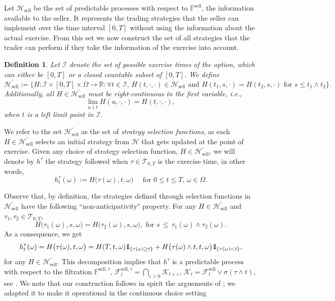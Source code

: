 \documentclass{article}
\def\ind{{\mathchoice{1\mskip-4mu\mathrm l}{1\mskip-4mu\mathrm l}
		{1\mskip-4.5mu\mathrm l}{1\mskip-5mu\mathrm l}}}
\newtheorem{definition}{Definition}[section]
\begin{document}
Let $\mathcal{H}_\text{sell}$ be the set of predictable processes with respect to $\mathbb{F}^\text{sell}$, the information available to the seller. It represents the trading strategies that the seller can implement over the time interval $[0, T]$ without using the information about the actual exercise. From this set we now construct the set of all strategies that the trader can perform if they take the information of the exercise into account.

\begin{definition}
	Let $\mathcal I$ denote the set of possible exercise times of the option, which can either be $[0, T]$ or a closed countable subset of $[0, T]$. We define
	\begin{equation}\label{eq:Hprime}
		\mathcal H^\prime_\text{sell} := \bigl\{H: \mathcal I\times [0,T] \times \Omega \to \mathbb R:  \forall t\in \mathcal I, \, H(t, \cdot, \cdot)\in 							\mathcal{H}_{\text{sell}} \text{ and }   H(t_1, s , \cdot)=H(t_2, s, \cdot) \text{ for } s\leq t_1\wedge t_2\bigr\}.
	\end{equation}
	Additionally, all $H\in \mathcal{H}^\prime_{\text{sell}}$ must be right-continuous in the first variable, i.e.,
	\[
		\lim_{u \downarrow t}H(u, \cdot, \cdot)= H(t, \cdot, \cdot),
	\]
	when $t$ is a left limit point in $\mathcal I$.
\end{definition}

We refer to the set $\mathcal{H}^\prime_{\text{sell}}$ as the set of \textit{strategy selection functions}, as each $H\in \mathcal{H}^\prime_{\text{sell}}$ selects an initial strategy from $\mathcal{H}$ that gets updated at the point of exercise. Given any choice of strategy selection function, $H\in \mathcal H^\prime_\text{sell}$, we will denote by $h^\tau$ the strategy followed when $\tau \in \mathcal{T}_{0,T}$ is the exercise time, in other words, 
\[
	h^\tau_t(\omega):=H\bigl(\tau(\omega), t,\omega\bigr) \quad \text{ for } 0\leq t\leq T, \, \omega\in \Omega.
\]

Observe that, by definition, the strategies defined through selection functions in $\mathcal{H}^\prime_{\text{sell}}$ have the following ``non-anticipativity" property. For any $H\in \mathcal{H}^\prime_{\text{sell}}$ and $\tau_1, \tau_2\in \mathcal T_{0,T}$, 
\[
	H\bigl(\tau_1(\omega), s, \omega\bigr) = H\bigl(\tau_2(\omega), s, \omega\bigr), \text{ for }s\,\leq \, \tau_1(\omega)\wedge \tau_2(\omega).
\]
As a consequence, we get
\begin{equation}\label{eq:htau}
	h^\tau_t(\omega) = H\bigl(\tau(\omega), t, \omega\bigr)= H(T, t, \omega)\ind_{\{\tau(\omega)\geq t\}}+ H\bigl(\tau(\omega)\wedge t,t,\omega\bigr)\ind_{\{\tau(\omega)<t\}},
\end{equation}
for any $H\in \mathcal H^\prime_\text{sell}$. This decomposition implies that $h^\tau$ is a predictable process with respect to the filtration $\mathbb{F}^{\text{sell},\tau}$, $\mathcal{F}^{\text{sell}, \tau}_t = \bigcap_{\varepsilon >0}\mathcal{K}_{t+\varepsilon}$,  $\mathcal{K}_{t} = \mathcal{F}^\text{sell}_t \vee \sigma(\tau \wedge t)$, see \cite[Section 9]{Nik06}. We note that our construction follows in spirit the arguements of \cite[Section 2]{Kue02}; we adapted it to make it operational in the continuous choice setting
\end{document}
